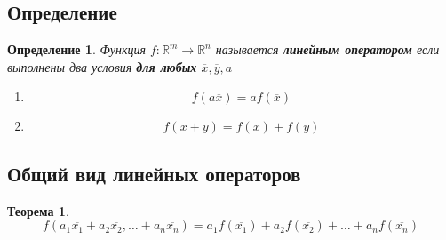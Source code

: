 \documentclass[]{article}
\newtheorem{dfn}{Определение}
\newtheorem{thr}{Теорема}
\begin{document}
	\subsection{Определение}
	\begin{dfn}
		Функция $f:\mathbb{R}^m\rightarrow\mathbb{R}^n$ называется \textbf{линейным оператором} если выполнены два условия \textbf{для любых} $\overline{x}, \overline{y}, a$
		\begin{enumerate}
			\item $$f(a\overline{x})=af(\overline{x})$$
			\item $$f(\overline{x}+\overline{y})=f(\overline{x})+f(\overline{y})$$
		\end{enumerate}
	\end{dfn}
	
	\subsection{Общий вид линейных операторов}
	\begin{thr}
		\begin{equation}\label{th2}
			f(a_1\overline{x_1}+ a_2\overline{x_2},\ldots+ a_n\overline{x_n})
			=
			a_1f(\overline{x_1})+ a_2f(\overline{x_2})+\ldots+ a_nf(\overline{x_n})
		\end{equation}
	\end{thr}
\end{document}
